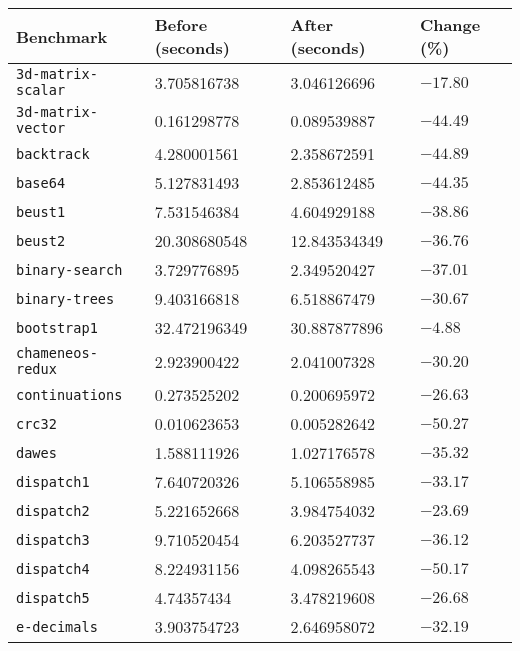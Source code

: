 \begin{longtable}{llll}
\toprule
Benchmark & Before (seconds) & After (seconds) & Change (\%) \\
\midrule
\endhead
\texttt{3d-matrix-scalar}         & 3.705816738       & 3.046126696         & $-17.80$    \\
\texttt{3d-matrix-vector}         & 0.161298778       & 0.089539887         & $-44.49$    \\
\texttt{backtrack}                & 4.280001561       & 2.358672591         & $-44.89$    \\
\texttt{base64}                   & 5.127831493       & 2.853612485         & $-44.35$    \\
\texttt{beust1}                   & 7.531546384       & 4.604929188         & $-38.86$    \\
\texttt{beust2}                   & 20.308680548      & 12.843534349        & $-36.76$    \\
\texttt{binary-search}            & 3.729776895       & 2.349520427         & $-37.01$    \\
\texttt{binary-trees}             & 9.403166818       & 6.518867479         & $-30.67$    \\
\texttt{bootstrap1}               & 32.472196349      & 30.887877896        & $-4.88$     \\
\texttt{chameneos-redux}          & 2.923900422       & 2.041007328         & $-30.20$    \\
\texttt{continuations}            & 0.273525202       & 0.200695972         & $-26.63$    \\
\texttt{crc32}                    & 0.010623653       & 0.005282642         & $-50.27$    \\
\texttt{dawes}                    & 1.588111926       & 1.027176578         & $-35.32$    \\
\texttt{dispatch1}                & 7.640720326       & 5.106558985         & $-33.17$    \\
\texttt{dispatch2}                & 5.221652668       & 3.984754032         & $-23.69$    \\
\texttt{dispatch3}                & 9.710520454       & 6.203527737         & $-36.12$    \\
\texttt{dispatch4}                & 8.224931156       & 4.098265543         & $-50.17$    \\
\texttt{dispatch5}                & 4.74357434        & 3.478219608         & $-26.68$    \\
\texttt{e-decimals}               & 3.903754723       & 2.646958072         & $-32.19$    \\

\end{longtable}
